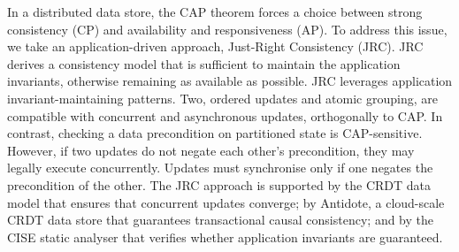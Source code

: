 \documentclass[a4paper,UKenglish]{dagrep-v2018}
\begin{document}

\license

In a distributed data store, the CAP theorem forces a choice between strong consistency (CP) and availability and responsiveness (AP). To address this issue, we take an application-driven approach, Just-Right Consistency (JRC). JRC derives a consistency model that is sufficient to maintain the application invariants, otherwise remaining as available as possible.
JRC leverages application invariant-maintaining patterns. Two, ordered updates and atomic grouping, are compatible with concurrent and asynchronous updates, orthogonally to CAP. In contrast, checking a data precondition on partitioned state is CAP-sensitive. However, if two updates do not negate each other's precondition, they may legally execute concurrently. Updates must synchronise only if one negates the precondition of the other.
The JRC approach is supported by the CRDT data model that ensures that concurrent updates converge; by Antidote, a cloud-scale CRDT data store that guarantees transactional causal consistency; and by the CISE static analyser that verifies whether application invariants are guaranteed.


\license
\end{document}
